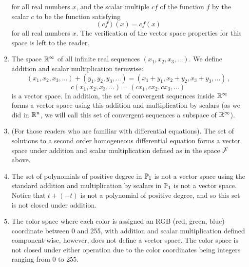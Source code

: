 \begin{example}
\begin{enumerate}
for all real numbers $x$, and the scalar multiple $cf$ of the function $f$ by the scalar $c$ to be the function satisfying
\[(cf)(x) = cf(x)\]
for all real numbers $x$. The verification of the vector space properties for this space is left to the reader. 
\item The space $\mathbb{R}^\infty$ of all infinite real sequences $(x_1, x_2, x_3, \ldots)$. We define addition and scalar multiplication termwise:
\[ (x_1, x_2, x_3, \ldots) + (y_1, y_2, y_3, \ldots) = (x_1+y_1, x_2+y_2, x_3+y_3, \ldots) \, ,\] 
\[c(x_1, x_2, x_3, \ldots) = (cx_1, cx_2, cx_3, \ldots) \, \]
is a vector space. In addition, the set of convergent sequences inside $\mathbb{R}^\infty$ forms a vector space using this addition and multiplication by scalars (as we did in $\mathbb{R}^n$, we will call this set of convergent sequences a subspace of $\mathbb{R}^{\infty}$).
\item (For those readers who are familiar with differential equations). The set of solutions to a second order homogeneous differential equation forms a vector space under addition and scalar multiplication defined as in the space $\mathcal{F}$ above.
\item The set of polynomials of positive degree in $\mathbb{P}_1$ is not a vector space using the standard addition and multiplication by scalars in $\mathbb{P}_1$ is not a vector space. Notice that $t + (-t)$ is not a polynomial of positive degree, and so this set is not closed under addition. 
\item The color space where each color is assigned an RGB (red, green, blue) coordinate between 0 and 255, with addition and scalar multiplication defined component-wise, however, does not define a vector space. The color space is not closed under either operation due to the color coordinates being integers ranging from 0 to 255. 
\end{enumerate}
\end{example}



